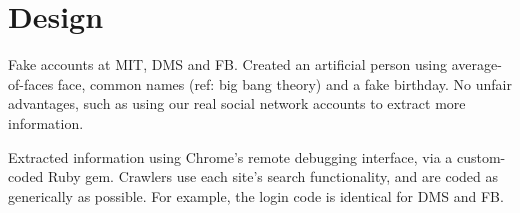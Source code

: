\section{Design}
\label{sec:design}

Fake accounts at MIT, DMS and FB. Created an artificial person using
average-of-faces face, common names (ref: big bang theory) and a fake birthday.
No unfair advantages, such as using our real social network accounts to extract
more information.

Extracted information using Chrome's remote debugging interface, via a
custom-coded Ruby gem. Crawlers use each site's search functionality, and are
coded as generically as possible. For example, the login code is identical for
DMS and FB.
